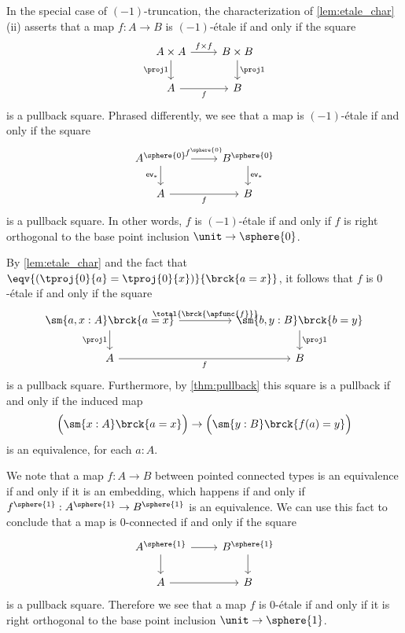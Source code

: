 \documentclass{msc}
\begin{document}
\begin{eg}\label{rmk:-1etale}
In the special case of $(-1)$-truncation, the characterization of \cref{lem:etale_char} (ii) asserts that a map $f:A\to B$ is $(-1)$-\'etale if and only if the square
\begin{equation*}
\begin{tikzcd}
A\times A \arrow[d,swap,"\proj 1"] \arrow[r,"{f\times f}"] & B\times B \arrow[d,"\proj 1"] \\
A \arrow[r,swap,"f"] & B
\end{tikzcd}
\end{equation*}
is a pullback square. Phrased differently, we see that a map is $(-1)$-\'etale if and only if the square
\begin{equation*}
\begin{tikzcd}
A^{\sphere{0}} \arrow[d,swap,"\mathsf{ev}_\ast"] \arrow[r,"f^{\sphere{0}}"] & B^{\sphere{0}} \arrow[d,"\mathsf{ev}_\ast"] \\
A \arrow[r,swap,"f"] & B
\end{tikzcd}
\end{equation*}
is a pullback square. In other words, $f$ is $(-1)$-\'etale if and only if $f$ is right orthogonal to the base point inclusion $\unit\to\sphere{0}$. 
\end{eg}

\begin{eg}
By \cref{lem:etale_char} and the fact that $\eqv{(\tproj{0}{a}=\tproj{0}{x})}{\brck{a=x}}$, it follows that $f$ is $0$-\'etale if and only if the square
\begin{equation*}
\begin{tikzcd}[column sep=huge]
\sm{a,x:A}\brck{a=x} \arrow[d,swap,"\proj 1"] \arrow[r,"\total{\brck{\apfunc{f}}}"] & \sm{b,y:B}\brck{b=y} \arrow[d,"\proj 1"] \\
A \arrow[r,swap,"f"] & B
\end{tikzcd}
\end{equation*}
is a pullback square. Furthermore, by \cref{thm:pullback} this square is a pullback if and only if the induced map
\begin{equation*}
\Big(\sm{x:A}\brck{a=x}\Big)\to\Big(\sm{y:B}\brck{f(a)=y}\Big)
\end{equation*}
is an equivalence, for each $a:A$.

We note that a map $f:A\to B$ between pointed connected types is an equivalence if and only if it is an embedding, which happens if and only if $f^{\sphere{1}}:A^{\sphere{1}} \to B^{\sphere{1}}$ is an equivalence. We can use this fact to conclude that a map is $0$-connected if and only if the square
\begin{equation*}
  \begin{tikzcd}
    A^{\sphere{1}} \arrow[r] \arrow[d] & B^{\sphere{1}} \arrow[d] \\
    A \arrow[r] & B
  \end{tikzcd}
\end{equation*}
is a pullback square. Therefore we see that a map $f$ is $0$-\'etale if and only if it is right orthogonal to the base point inclusion $\unit\to\sphere{1}$.
\end{eg}
\end{document}
